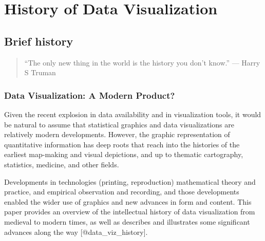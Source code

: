 \documentclass[]{book}
\theoremstyle{definition}
\theoremstyle{definition}
\theoremstyle{definition}
\theoremstyle{remark}
\begin{document}
\section{History of Data
Visualization}\label{history-of-data-visualization}

\subsection{Brief history}\label{brief-history}

\begin{quote}
``The only new thing in the world is the history you don't know.'' ---
Harry S Truman
\end{quote}

\subsubsection{Data Visualization: A Modern
Product?}\label{data-visualization-a-modern-product}

Given the recent explosion in data availability and in visualization
tools, it would be natural to assume that statistical graphics and data
visualizations are relatively modern developments. However, the graphic
representation of quantitative information has deep roots that reach
into the histories of the earliest map-making and visual depictions, and
up to thematic cartography, statistics, medicine, and other fields.

Developments in technologies (printing, reproduction) mathematical
theory and practice, and empirical observation and recording, and those
developments enabled the wider use of graphics and new advances in form
and content. This paper provides an overview of the intellectual history
of data visualization from medieval to modern times, as well as
describes and illustrates some significant advances along the way
{[}@data\_viz\_history{]}.
\end{document}
